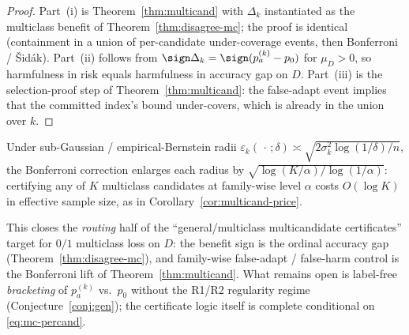 \begin{proof}
Part~(i) is Theorem~\ref{thm:multicand} with $\Delta_k$ instantiated as the multiclass benefit
of Theorem~\ref{thm:disagree-mc}; the proof is identical (containment in a union of
per-candidate under-coverage events, then Bonferroni / \v Sid\'ak).  Part~(ii) follows from
$\sign\Delta_k=\sign(p_a^{(k)}-p_0)$ for $\mu_D>0$, so harmfulness in risk equals harmfulness
in accuracy gap on $D$.  Part~(iii) is the selection-proof step of Theorem~\ref{thm:multicand}:
the false-adapt event implies that the committed index's bound under-covers, which is already in
the union over $k$.
\end{proof}

\begin{corollary}\label{cor:mc-route-price}
Under sub-Gaussian / empirical-Bernstein radii
$\varepsilon_k(\,\cdot\,;\delta)\asymp\sqrt{2\sigma_k^2\log(1/\delta)/n}$, the Bonferroni
correction enlarges each radius by
$\sqrt{\log(K/\alpha)/\log(1/\alpha)}$: certifying any of $K$ multiclass candidates at
family-wise level $\alpha$ costs $O(\log K)$ in effective sample size, as in
Corollary~\ref{cor:multicand-price}.
\end{corollary}

\begin{remark}\label{rmk:mc-route-scope}
This closes the \emph{routing} half of the ``general/multiclass multicandidate certificates''
target for $0/1$ multiclass loss on $D$: the benefit sign is the ordinal accuracy gap
(Theorem~\ref{thm:disagree-mc}), and family-wise false-adapt / false-harm control is the
Bonferroni lift of Theorem~\ref{thm:multicand}.  What remains open is label-free
\emph{bracketing} of $p_a^{(k)}$ vs.\ $p_0$ without the R1/R2 regularity regime
(Conjecture~\ref{conj:gen}); the certificate logic itself is complete conditional on
\eqref{eq:mc-percand}.
\end{remark}
